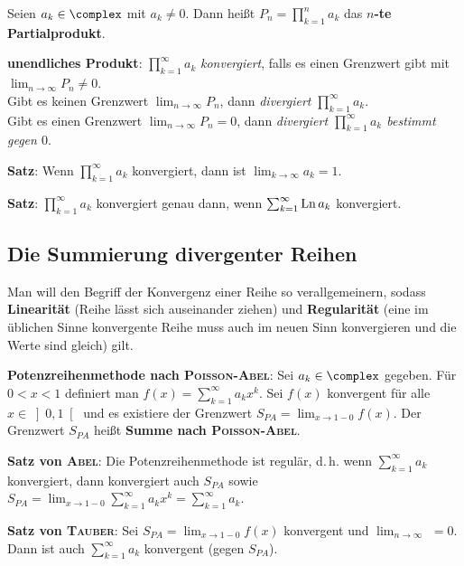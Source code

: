 Seien $a_k \in \complex$ mit $a_k \not= 0$.
Dann heißt $P_n = \prod_{k=1}^n a_k$ das \textbf{$n$-te Partialprodukt}.

\textbf{unendliches Produkt}:
$\prod_{k=1}^\infty a_k$ \emph{konvergiert}, falls es einen Grenzwert gibt mit
$\lim_{n \to \infty} P_n \not= 0$. \\
Gibt es keinen Grenzwert $\lim_{n \to \infty} P_n$, dann \emph{divergiert}
$\prod_{k=1}^\infty a_k$. \\
Gibt es einen Grenzwert $\lim_{n \to \infty} P_n = 0$, dann \emph{divergiert
$\prod_{k=1}^\infty a_k$ bestimmt gegen $0$}.

\textbf{Satz}: Wenn $\prod_{k=1}^\infty a_k$ konvergiert, dann ist
$\lim_{k \to \infty} a_k = 1$.

\textbf{Satz}: $\prod_{k=1}^\infty a_k$ konvergiert genau dann, wenn
$\sum_{k=1}^\infty \operatorname{Ln} a_k$ konvergiert.

\subsection{%
    Die Summierung divergenter Reihen%
}

Man will den Begriff der Konvergenz einer Reihe so verallgemeinern, sodass
\textbf{Linearität} (Reihe lässt sich auseinander ziehen) und
\textbf{Regularität} (eine im üblichen Sinne konvergente Reihe muss auch im
neuen Sinn konvergieren und die Werte sind gleich) gilt.

\linie

\textbf{Potenzreihenmethode nach \textsc{Poisson}-\textsc{Abel}}:
Sei $a_k \in \complex$ gegeben.
Für $0 < x < 1$ definiert man $f(x) = \sum_{k=1}^\infty a_k x^k$.
Sei $f(x)$ konvergent für alle $x \in \left]0,1\right[$ und es existiere
der Grenzwert $S_{PA} = \lim_{x \to 1-0} f(x)$.
Der Grenzwert $S_{PA}$ heißt
\textbf{Summe nach \textsc{Poisson}-\textsc{Abel}}.

\textbf{Satz von \textsc{Abel}}:
Die Potenzreihenmethode ist regulär, d.\,h. wenn $\sum_{k=1}^\infty a_k$
konvergiert, dann konvergiert auch $S_{PA}$ sowie
$S_{PA} = \lim_{x \to 1-0} \sum_{k=1}^\infty a_k x^k = \sum_{k=1}^\infty a_k$.

\textbf{Satz von \textsc{Tauber}}:
Sei $S_{PA} = \lim_{x \to 1-0} f(x)$ konvergent und
$\lim_{n \to \infty}$ 
$= 0$. \\
Dann ist auch $\sum_{k=1}^\infty a_k$ konvergent (gegen $S_{PA}$).

\linie

